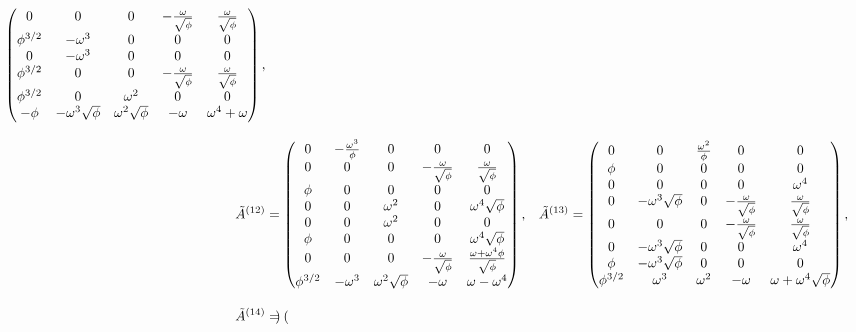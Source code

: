 \begin{align}
\begin{pmatrix}
    0 & 0 & 0 & -\frac{\omega}{\sqrt{\phi}} & \frac{\omega}{\sqrt{\phi}} \\
    \phi^{3/2} & -\omega^3 & 0 & 0 & 0 \\
    0 & -\omega^3 & 0 & 0 & 0 \\
    \phi^{3/2} & 0 & 0 & -\frac{\omega}{\sqrt{\phi}} & \frac{\omega}{\sqrt{\phi}} \\
    \phi^{3/2} & 0 & \omega^2 & 0 & 0 \\
    -\phi & -\omega^3\sqrt{\phi} & \omega^2 \sqrt{\phi} & -\omega & \omega^4+\omega \\
  \end{pmatrix}, \notag \\[2ex]
  \tilde{A}^{(12)} &= \begin{pmatrix}
    0 & -\frac{\omega^3}{\phi} & 0 & 0 & 0 \\
    0 & 0 & 0 & -\frac{\omega}{\sqrt{\phi}} & \frac{\omega}{\sqrt{\phi}} \\
    \phi & 0 & 0 & 0 & 0 \\
    0 & 0 & \omega^2 & 0 & \omega^4 \sqrt{\phi} \\
    0 & 0 & \omega^2 & 0 & 0 \\
    \phi & 0 & 0 & 0 & \omega^4 \sqrt{\phi} \\
    0 & 0 & 0 & -\frac{\omega}{\sqrt{\phi}} & \frac{\omega+\omega^4 \phi}{\sqrt{\phi}} \\
    \phi^{3/2} & -\omega^3 & \omega^2 \sqrt{\phi} & -\omega & \omega-\omega^4 \\
  \end{pmatrix}, &
  \tilde{A}^{(13)} &= \begin{pmatrix}
    0 & 0 & \frac{\omega^2}{\phi} & 0 & 0 \\
    \phi & 0 & 0 & 0 & 0 \\
    0 & 0 & 0 & 0 & \omega^4 \\
    0 & -\omega^3\sqrt{\phi} & 0 & -\frac{\omega}{\sqrt{\phi}} & \frac{\omega}{\sqrt{\phi}} \\
    0 & 0 & 0 & -\frac{\omega}{\sqrt{\phi}} & \frac{\omega}{\sqrt{\phi}} \\
    0 & -\omega^3\sqrt{\phi} & 0 & 0 & \omega^4 \\
    \phi & -\omega^3\sqrt{\phi} & 0 & 0 & 0 \\
    \phi^{3/2} & \omega^3 & \omega^2 & -\omega & \omega+\omega^4 \sqrt{\phi} \\
  \end{pmatrix}, \notag \\[2ex]
  \tilde{A}^{(14)} &= \begin{pmatrix}

\end{pmatrix}
\end{align}
